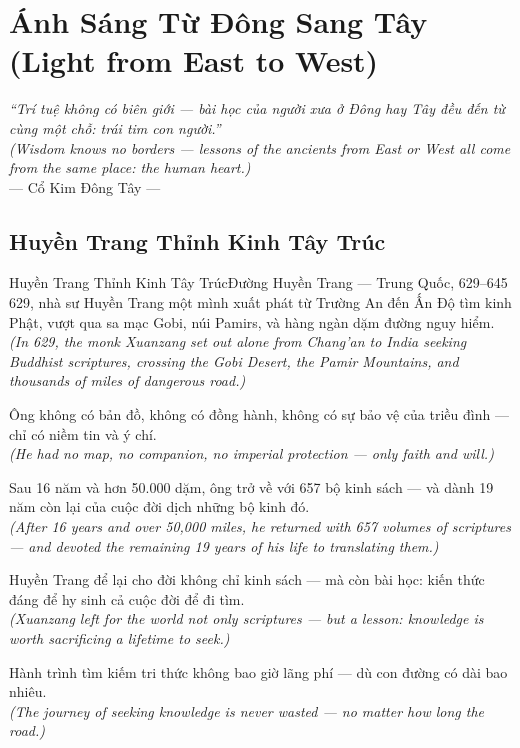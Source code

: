 \chapter{Ánh Sáng Từ Đông Sang Tây (Light from East to West)}
\begin{center}
  \textit{\color{truyengold}``Trí tuệ không có biên giới --- bài học của người xưa ở Đông hay Tây đều đến từ cùng một chỗ: trái tim con người.''}\\[4pt]
  \textit{(Wisdom knows no borders --- lessons of the ancients from East or West all come from the same place: the human heart.)}\\[4pt]
  \small\color{truyenblue}--- Cổ Kim Đông Tây ---
\end{center}
\ngancach

\section{Huyền Trang Thỉnh Kinh Tây Trúc}
\begin{truyen}{Huyền Trang Thỉnh Kinh Tây Trúc}{Đường Huyền Trang --- Trung Quốc, 629--645}
 629, nhà sư Huyền Trang một mình xuất phát từ Trường An đến Ấn Độ tìm kinh Phật, vượt qua sa mạc Gobi, núi Pamirs, và hàng ngàn dặm đường nguy hiểm.\\[4pt]
\textit{(In 629, the monk Xuanzang set out alone from Chang'an to India seeking Buddhist scriptures, crossing the Gobi Desert, the Pamir Mountains, and thousands of miles of dangerous road.)}

Ông không có bản đồ, không có đồng hành, không có sự bảo vệ của triều đình --- chỉ có niềm tin và ý chí.\\[4pt]
\textit{(He had no map, no companion, no imperial protection --- only faith and will.)}

Sau 16 năm và hơn 50.000 dặm, ông trở về với 657 bộ kinh sách --- và dành 19 năm còn lại của cuộc đời dịch những bộ kinh đó.\\[4pt]
\textit{(After 16 years and over 50,000 miles, he returned with 657 volumes of scriptures --- and devoted the remaining 19 years of his life to translating them.)}

Huyền Trang để lại cho đời không chỉ kinh sách --- mà còn bài học: kiến thức đáng để hy sinh cả cuộc đời để đi tìm.\\[4pt]
\textit{(Xuanzang left for the world not only scriptures --- but a lesson: knowledge is worth sacrificing a lifetime to seek.)}

\end{truyen}
\begin{baihoc}
  Hành trình tìm kiếm tri thức không bao giờ lãng phí --- dù con đường có dài bao nhiêu.\\[4pt]
  \textit{(The journey of seeking knowledge is never wasted --- no matter how long the road.)}
\end{baihoc}

